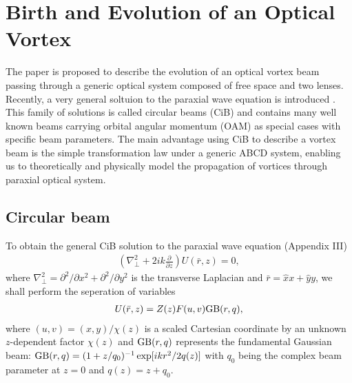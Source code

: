 \section{Birth and Evolution of an Optical Vortex \cite{ValBE16}}
\label{sec:birth_evol}
The paper is proposed to describe the evolution of an optical vortex beam passing through a generic optical system composed of free space and two lenses. Recently, a very general soltuion to the paraxial wave equation is introduced \cite{Ban08CiB}. This family of solutions is called circular beams (CiB) and contains many well known beams carrying orbital angular momentum (OAM) as special cases with specific beam parameters. The main advantage using CiB to describe a vortex beam is the simple transformation law under a generic ABCD system, enabling us to theoretically and physically model the propagation of vortices through paraxial optical system.
\subsection{Circular beam}
To obtain the general CiB solution to the paraxial wave equation (Appendix III)
\begin{eqnarray}
	\left(\nabla_{\perp}^2 + 2ik \frac{\partial}{\partial z} \right) U(\bar{r}, z) = 0,
\end{eqnarray}
where $\nabla_{\perp}^2 = \partial^2 / \partial x^2 + \partial^2 / \partial y^2$ is the transverse Laplacian and $\bar{r} = \hat{x} x + \hat{y} y$, we shall perform the seperation of variables
\begin{eqnarray}
	U(\bar{r}, z) = Z(z) F(u, v) {\rm GB}(r, q),
\end{eqnarray}
where $(u, v) = (x, y)/\chi(z)$ is a scaled Cartesian coordinate by an unknown $z$-dependent factor $\chi(z)$ and ${\rm GB}(r, q)$ represents the fundamental Gaussian beam: ${\rm GB}(r, q) = (1 + z/q_0)^{-1} \exp[ i k r^2/ 2q(z)]$ with $q_0$ being the complex beam parameter at $z = 0$ and $q(z) = z + q_0$.